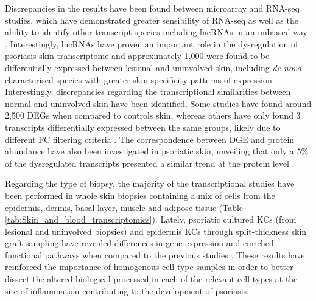 Discrepancies in the results have been found between microarray and RNA-seq studies, which have demonstrated greater sensibility of RNA-seq as well as the ability to identify other transcript species including lncRNAs in an unbiased way \parencite{Jaabari2011, Li2014}. Interestingly, lncRNAs have proven an important role in the dysregulation of psoriasis skin transcriptome and approximately 1,000 were found to be differentially expressed between lesional and uninvolved skin, including \textit{de novo} characterised species with greater skin-specificity patterns of expression \parencite{Tsoi2015}. Interestingly, discrepancies regarding the transcriptional similarities between normal and uninvolved skin have been identified. Some studies have found around 2,500 DEGs when compared to controls skin, whereas others have only found 3 transcripts differentially expressed between the same groups, likely due to different FC filtering criteria \parencite{Keermann2015, Tsoi2015}. The correspondence between DGE and protein abundance have also been investigated in psoriatic skin, unveiling that only a 5\% of the dysregulated transcripts presented a similar trend at the protein level \parencite{Swindell2015}.   

Regarding the type of biopsy, the majority of the transcriptional studies have been performed in whole skin biopsies containing a mix of cells from the epidermis, dermis, basal layer, muscle and adipose tissue (Table \ref{tab:Skin_and_blood_transcriptomics}). Lately, psoriatic cultured KCs (from lesional and uninvolved biopsies) and epidermis KCs through split-thickness skin graft sampling have revealed differences in gene expression and enriched functional pathways when compared to the previous studies \parencite{Swindell2017,Tervaniemi2016}. These results have reinforced the importance of homogenous cell type samples in order to better dissect the altered biological processed in each of the relevant cell types at the site of inflammation contributing to the development of psoriasis. 


